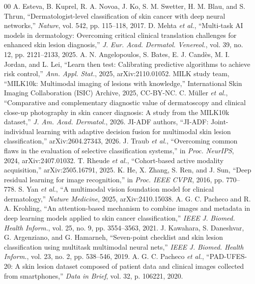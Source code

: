 \documentclass[conference]{IEEEtran}
\begin{document}
\begin{thebibliography}{00}
 A. Esteva, B. Kuprel, R. A. Novoa, J. Ko, S. M. Swetter, H. M. Blau, and S. Thrun, ``Dermatologist-level classification of skin cancer with deep neural networks,'' \textit{Nature}, vol. 542, pp. 115--118, 2017.
 D. Mehta \textit{et al.}, ``Multi-task AI models in dermatology: Overcoming critical clinical translation challenges for enhanced skin lesion diagnosis,'' \textit{J. Eur. Acad. Dermatol. Venereol.}, vol. 39, no. 12, pp. 2121--2133, 2025.
 A. N. Angelopoulos, S. Bates, E. J. Cand\`es, M. I. Jordan, and L. Lei, ``Learn then test: Calibrating predictive algorithms to achieve risk control,'' \textit{Ann. Appl. Stat.}, 2025, arXiv:2110.01052.
 MILK study team, ``MILK10k: Multimodal imaging of lesions with knowledge,'' International Skin Imaging Collaboration (ISIC) Archive, 2025, CC-BY-NC.
 C. M\"uller \textit{et al.}, ``Comparative and complementary diagnostic value of dermatoscopy and clinical close-up photography in skin cancer diagnosis: A study from the MILK10k dataset,'' \textit{J. Am. Acad. Dermatol.}, 2026.
 JI-ADF authors, ``JI-ADF: Joint-individual learning with adaptive decision fusion for multimodal skin lesion classification,'' arXiv:2604.27343, 2026.
 J. Traub \textit{et al.}, ``Overcoming common flaws in the evaluation of selective classification systems,'' in \textit{Proc. NeurIPS}, 2024, arXiv:2407.01032.
 T. Rheude \textit{et al.}, ``Cohort-based active modality acquisition,'' arXiv:2505.16791, 2025.
 K. He, X. Zhang, S. Ren, and J. Sun, ``Deep residual learning for image recognition,'' in \textit{Proc. IEEE CVPR}, 2016, pp. 770--778.
 S. Yan \textit{et al.}, ``A multimodal vision foundation model for clinical dermatology,'' \textit{Nature Medicine}, 2025, arXiv:2410.15038.
 A. G. C. Pacheco and R. A. Krohling, ``An attention-based mechanism to combine images and metadata in deep learning models applied to skin cancer classification,'' \textit{IEEE J. Biomed. Health Inform.}, vol. 25, no. 9, pp. 3554--3563, 2021.
 J. Kawahara, S. Daneshvar, G. Argenziano, and G. Hamarneh, ``Seven-point checklist and skin lesion classification using multitask multimodal neural nets,'' \textit{IEEE J. Biomed. Health Inform.}, vol. 23, no. 2, pp. 538--546, 2019.
 A. G. C. Pacheco \textit{et al.}, ``PAD-UFES-20: A skin lesion dataset composed of patient data and clinical images collected from smartphones,'' \textit{Data in Brief}, vol. 32, p. 106221, 2020.

\end{thebibliography}
\end{document}
